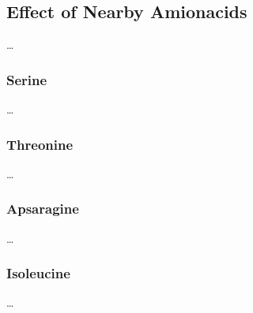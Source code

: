 \subsection{Effect of Nearby Amionacids}
\ldots

\subsubsection{Serine}
\ldots
\subsubsection{Threonine}
\ldots
\subsubsection{Apsaragine}
\ldots
\subsubsection{Isoleucine}
\ldots

\cleardoublepage

